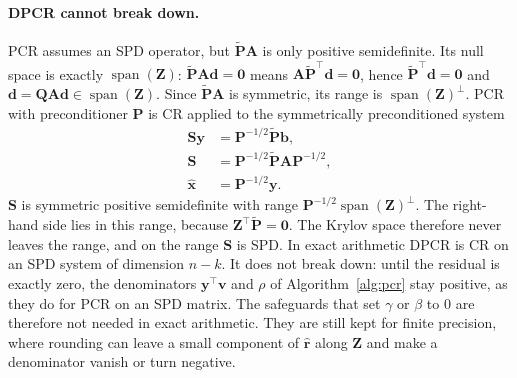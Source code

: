 \paragraph{DPCR cannot break down.}
PCR assumes an SPD operator, but $\tilde{\mathbf{P}}\mathbf{A}$ is only
positive semidefinite. Its null space is exactly
$\operatorname{span}(\mathbf{Z})$: $\tilde{\mathbf{P}}\mathbf{A}\mathbf{d} = \mathbf{0}$
means $\mathbf{A}\tilde{\mathbf{P}}^\top\mathbf{d} = \mathbf{0}$, hence
$\tilde{\mathbf{P}}^\top\mathbf{d} = \mathbf{0}$ and
$\mathbf{d} = \mathbf{Q}\mathbf{A}\mathbf{d} \in \operatorname{span}(\mathbf{Z})$.
Since $\tilde{\mathbf{P}}\mathbf{A}$ is symmetric, its range is
$\operatorname{span}(\mathbf{Z})^\perp$. PCR with preconditioner $\mathbf{P}$
is CR applied to the symmetrically preconditioned system
\begin{equation}
  \begin{aligned}
    \mathbf{S}\mathbf{y} &= \mathbf{P}^{-1/2}\tilde{\mathbf{P}}\mathbf{b}, \\
    \mathbf{S} &= \mathbf{P}^{-1/2}\tilde{\mathbf{P}}\mathbf{A}\mathbf{P}^{-1/2}, \\
    \hat{\mathbf{x}} &= \mathbf{P}^{-1/2}\mathbf{y} .
  \end{aligned}
\end{equation}
$\mathbf{S}$ is symmetric positive semidefinite with range
$\mathbf{P}^{-1/2}\operatorname{span}(\mathbf{Z})^\perp$. The right-hand side
lies in this range, because $\mathbf{Z}^\top\tilde{\mathbf{P}} = \mathbf{0}$.
The Krylov space therefore never leaves the range, and on the range
$\mathbf{S}$ is SPD. In exact arithmetic DPCR is CR on an SPD system of
dimension $n-k$. It does not break down: until the residual is exactly zero,
the denominators $\mathbf{y}^\top\mathbf{v}$ and $\rho$ of
Algorithm~\ref{alg:pcr} stay positive, as they do for PCR on an SPD
matrix. The safeguards that set $\gamma$ or $\beta$ to $0$ are therefore not
needed in exact arithmetic. They are still kept for finite precision, where
rounding can leave a small component of $\hat{\mathbf{r}}$ along
$\mathbf{Z}$ and make a denominator vanish or turn negative.


